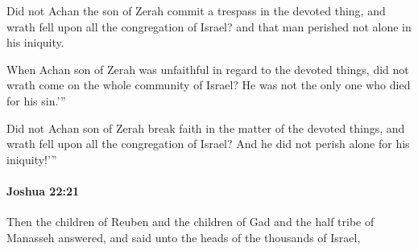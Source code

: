 			\begin{versebox}
					\item[BHS] 
					\item[ASV] Did not Achan the son of Zerah commit a trespass in the devoted thing, and wrath fell upon all the congregation of Israel? and that man perished not alone in his iniquity.
					\item[NIV] When Achan son of Zerah was unfaithful in regard to the devoted things, did not wrath come on the whole community of Israel? He was not the only one who died for his sin.’”
					\item[NRSV] Did not Achan son of Zerah break faith in the matter of the devoted things, and wrath fell upon all the congregation of Israel? And he did not perish alone for his iniquity!’”
			\end{versebox}

		\paragraph{Joshua 22:21} %
			\label{JOSHUA-22-21}

			Then the children of Reuben and the children of Gad and the half tribe of Manasseh answered, and said unto the heads of the thousands of Israel,

